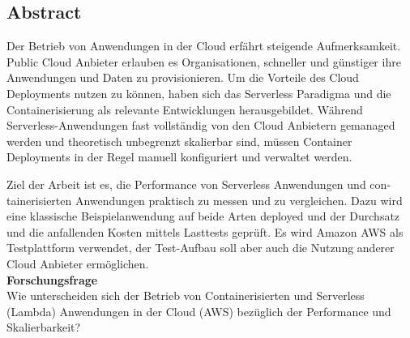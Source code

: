 

\begin{otherlanguage}{american}
\chapter*{Abstract}
Der Betrieb von Anwendungen in der Cloud erfährt steigende Aufmerksamkeit. Public Cloud Anbieter erlauben es Organisationen, schneller und günstiger ihre Anwendungen und Daten zu provisionieren. Um die Vorteile des Cloud Deployments nutzen zu können, haben sich das Serverless Paradigma und die Containerisierung als relevante Entwicklungen herausgebildet. Während Serverless-Anwendungen fast vollständig von den Cloud Anbietern gemanaged werden und theoretisch unbegrenzt skalierbar sind, müssen Container Deployments in der Regel manuell konfiguriert und verwaltet werden. 

Ziel der Arbeit ist es, die Performance von Serverless Anwendungen und containerisierten Anwendungen praktisch zu messen und zu vergleichen. Dazu wird eine klassische Beispielanwendung auf beide Arten deployed und der Durchsatz und die anfallenden Kosten mittels Lasttests geprüft.
Es wird Amazon AWS als Testplattform verwendet, der Test-Aufbau soll aber auch die Nutzung anderer Cloud Anbieter ermöglichen. \\

\noindent\textbf{Forschungsfrage} \\
Wie unterscheiden sich der Betrieb von Containerisierten und Serverless (Lambda) Anwendungen in der Cloud (AWS) bezüglich der Performance und Skalierbarkeit?
\end{otherlanguage}